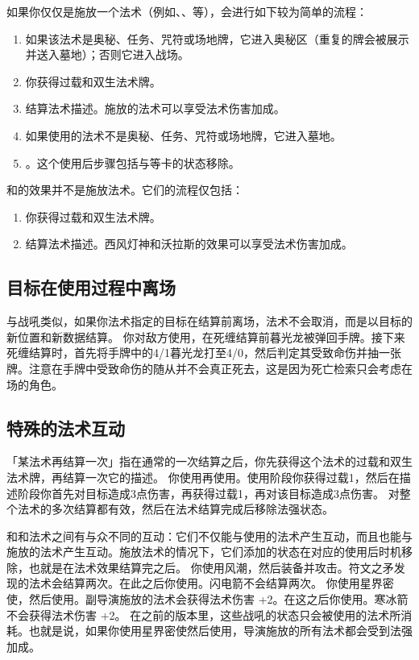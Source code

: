 如果你仅仅是施放一个法术（例如、、等），会进行如下较为简单的流程：
\begin{enumerate}
    \item 如果该法术是奥秘、任务、咒符或场地牌，它进入奥秘区（重复的牌会被展示并送入墓地）；否则它进入战场。
    \item 你获得过载和双生法术牌。
    \item 结算法术描述。施放的法术可以享受法术伤害加成。
    \item 如果使用的法术不是奥秘、任务、咒符或场地牌，它进入墓地。
    \item {}。这个使用后步骤包括与等卡的状态移除。
\end{enumerate}

和的效果并不是施放法术。它们的流程仅包括：
\begin{enumerate}
    \item 你获得过载和双生法术牌。
    \item 结算法术描述。西风灯神和沃拉斯的效果可以享受法术伤害加成。
\end{enumerate}


\subsection{目标在使用过程中离场}

与战吼类似，如果你法术指定的目标在结算前离场，法术不会取消，而是以目标的新位置和新数据结算。
\example 你对敌方使用，在死缠结算前暮光龙被弹回手牌。接下来死缠结算时，首先将手牌中的4/1暮光龙打至4/0，然后判定其受致命伤并抽一张牌。注意在手牌中受致命伤的随从并不会真正死去，这是因为死亡检索只会考虑在场的角色。

\subsection{特殊的法术互动}

「某法术再结算一次」指在通常的一次结算之后，你先获得这个法术的过载和双生法术牌，再结算一次它的描述。
\example 你使用再使用。使用阶段你获得过载1，然后在描述阶段你首先对目标造成3点伤害，再获得过载1，再对该目标造成3点伤害。
\notice {}对整个法术的多次结算都有效，然后在法术结算完成后移除法强状态。

和和法术之间有与众不同的互动：它们不仅能与使用的法术产生互动，而且也能与施放的法术产生互动。施放法术的情况下，它们添加的状态在对应的使用后时机移除，也就是在法术效果结算完之后。
\example {}你使用风潮，然后装备并攻击。符文之矛发现的法术会结算两次。在此之后你使用。闪电箭不会结算两次。
\example {}你使用星界密使，然后使用。副导演施放的法术会获得法术伤害 +2。在这之后你使用。寒冰箭不会获得法术伤害 +2。
\notice 在之前的版本里，这些战吼的状态只会被使用的法术所消耗。也就是说，如果你使用星界密使然后使用，导演施放的所有法术都会受到法强加成。

